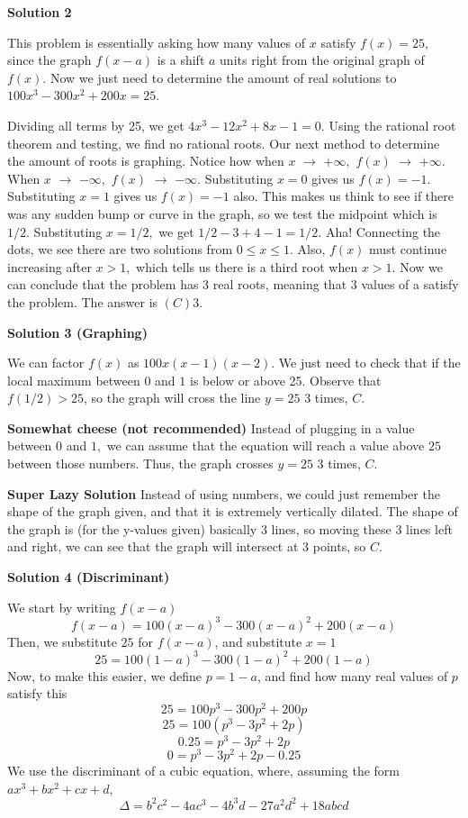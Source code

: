 \begin{enumerate}
 



\textbf{Solution 2}

This problem is essentially asking how many values of $x$ satisfy $f(x)=25,$ since the graph $f(x-a)$ is a shift $a$ units right from the original graph of $f(x).$ Now we just need to determine the amount of real solutions to $100x^3-300x^2+200x=25.$

 Dividing all terms by 25, we get $4x^3-12x^2+8x-1=0.$ Using the rational root theorem and testing, we find no rational roots. Our next method to determine the amount of roots is graphing. Notice how when $x$ $\to$ $+\infty,$ $f(x)$ $\to$ $+\infty.$ When $x$ $\to$ $-\infty,$ $f(x)$ $\to$ $-\infty.$ Substituting $x=0$ gives us $f(x)=-1.$ Substituting $x=1$ gives us $f(x)=-1$ also. This makes us think to see if there was any sudden bump or curve in the graph, so we test the midpoint which is $1/2.$ Substituting $x=1/2,$ we get $1/2-3+4-1=1/2.$ Aha! Connecting the dots, we see there are two solutions from $0\leq x \leq 1.$ Also, $f(x)$ must continue increasing after $x>1,$ which tells us there is a third root when $x>1.$ Now we can conclude that the problem has 3 real roots, meaning that 3 values of a satisfy the problem. The answer is $\boxed {(C) 3}.$




\textbf{Solution 3 (Graphing)}

We can factor $f(x)$ as $100x(x-1)(x-2)$. We just need to check that if the local maximum between $0$ and $1$ is below or above 25. Observe that $f(1/2)>25$, so the graph will cross the line $y=25$ 3 times, $\boxed {C}.$

 \textbf{Somewhat cheese (not recommended)} Instead of plugging in a value between $0$ and $1,$ we can assume that the equation will reach a value above $25$ between those numbers. Thus, the graph crosses $y=25$ 3 times, $\boxed {C}.$

 \textbf{Super Lazy Solution} Instead of using numbers, we could just remember the shape of the graph given, and that it is extremely vertically dilated. The shape of the graph is (for the y-values given) basically $3$ lines, so moving these $3$ lines left and right, we can see that the graph will intersect at 3 points, so $\boxed {C}.$




\textbf{Solution 4 (Discriminant)}

We start by writing $f(x-a)$
 \[f(x-a)=100(x-a)^3-300(x-a)^2+200(x-a)\]Then, we substitute $25$ for $f(x-a)$, and substitute $x=1$
 \[25 = 100(1-a)^3-300(1-a)^2+200(1-a)\]Now, to make this easier, we define $p=1-a$, and find how many real values of $p$ satisfy this
 \[25 = 100p^3-300p^2+200p\]
 \[25 = 100(p^3-3p^2+2p)\]
 \[0.25 = p^3-3p^2+2p\]
 \[0= p^3-3p^2+2p-0.25\]We use the discriminant of a cubic equation, where, assuming the form $ax^3+bx^2+cx+d$, 
 \[\Delta=b^2c^2-4ac^3-4b^3d-27a^2d^2+18abcd\]


\end{enumerate}
